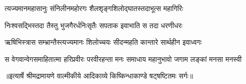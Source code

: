\twolineshloka
{त्यज्यमानमहासानुः संनिलीनमहोरगः}
{शैलशृङ्गशिलोद्घातस्तदाभूत्स महागिरिः} %

\twolineshloka
{निःश्वसद्भिस्तदा तैस्तु भुजगैरर्धनिःसृतैः}
{सपताक इवाभाति स तदा धरणीधरः} %

\twolineshloka
{ऋषिभिस्त्रास सम्भ्रान्तैस्त्यज्यमानः शिलोच्चयः}
{सीदन्महति कान्तारे सार्थहीन इवाध्वगः} %

\fourlineindentedshloka
{स वेगवान्वेगसमाहितात्मा}
{हरिप्रवीरः परवीरहन्ता}
{मनः समाधाय महानुभावो}
{जगाम लङ्कां मनसा मनस्वी} %


{॥इत्यार्षे श्रीमद्रामायणे वाल्मीकीये आदिकाव्ये किष्किन्धाकाण्डे षट्षष्टितमः सर्गः॥}

